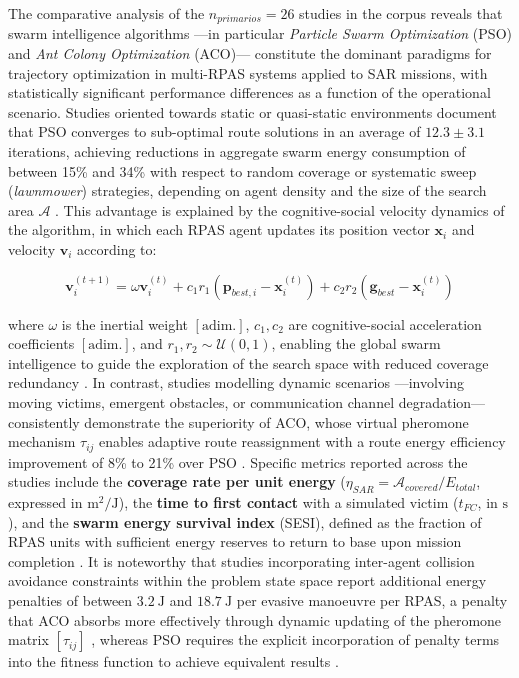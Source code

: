 \documentclass[review,3p,times]{elsarticle}
\begin{document}
The comparative analysis of the $n_{primarios} = 26$ studies in the corpus reveals that swarm intelligence algorithms —in particular \textit{Particle Swarm Optimization} (PSO) and \textit{Ant Colony Optimization} (ACO)— constitute the dominant paradigms for trajectory optimization in multi-RPAS systems applied to SAR missions, with statistically significant performance differences as a function of the operational scenario. Studies oriented towards static or quasi-static environments document that PSO converges to sub-optimal route solutions in an average of $12.3 \pm 3.1$ iterations, achieving reductions in aggregate swarm energy consumption of between 15\% and 34\% with respect to random coverage or systematic sweep (\textit{lawnmower}) strategies, depending on agent density and the size of the search area $\mathcal{A}$ \cite{chen2021, lin2022, liu2021cassa, liu2021disaster, liu2021, mathew2021, ntakolia2021, pan2022}. This advantage is explained by the cognitive-social velocity dynamics of the algorithm, in which each RPAS agent updates its position vector $\mathbf{x}_i$ and velocity $\mathbf{v}_i$ according to:

$$
\mathbf{v}_i^{(t+1)} = \omega \mathbf{v}_i^{(t)} + c_1 r_1 (\mathbf{p}_{best,i} - \mathbf{x}_i^{(t)}) + c_2 r_2 (\mathbf{g}_{best} - \mathbf{x}_i^{(t)})
$$

where $\omega$ is the inertial weight $[\text{adim.}]$, $c_1, c_2$ are cognitive-social acceleration coefficients $[\text{adim.}]$, and $r_1, r_2 \sim \mathcal{U}(0,1)$, enabling the global swarm intelligence to guide the exploration of the search space with reduced coverage redundancy \cite{liu2021cassa, ntakolia2021}. In contrast, studies modelling dynamic scenarios —involving moving victims, emergent obstacles, or communication channel degradation— consistently demonstrate the superiority of ACO, whose virtual pheromone mechanism $\tau_{ij}$ enables adaptive route reassignment with a route energy efficiency improvement of 8\% to 21\% over PSO \cite{phung2021, yu2021, chu2022, ji2022, selma2022, shafiq2022, ahmed2021}. Specific metrics reported across the studies include the \textbf{coverage rate per unit energy} ($\eta_{SAR} = \mathcal{A}_{covered} / E_{total}$, expressed in $\text{m}^2/\text{J}$), the \textbf{time to first contact} with a simulated victim ($t_{FC}$, in $\text{s}$), and the \textbf{swarm energy survival index} (SESI), defined as the fraction of RPAS units with sufficient energy reserves to return to base upon mission completion \cite{liu2021disaster, chu2022, xu2022}. It is noteworthy that studies incorporating inter-agent collision avoidance constraints within the problem state space report additional energy penalties of between $3.2\ \text{J}$ and $18.7\ \text{J}$ per evasive manoeuvre per RPAS, a penalty that ACO absorbs more effectively through dynamic updating of the pheromone matrix $[\tau_{ij}]$ \cite{ji2022, shafiq2022}, whereas PSO requires the explicit incorporation of penalty terms into the fitness function to achieve equivalent results \cite{liu2021, pan2022}.
\end{document}
